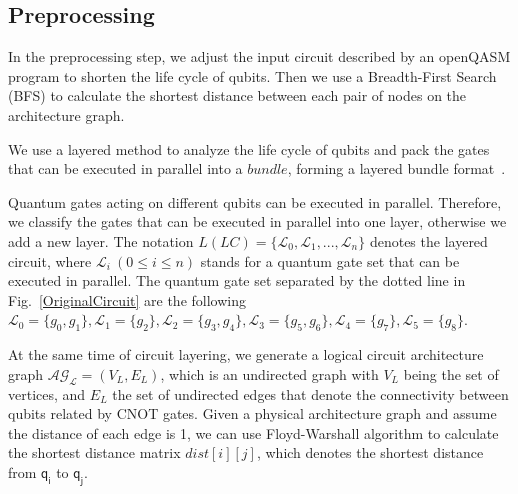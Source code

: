 \documentclass[journal]{IEEEtran}
\begin{document}
\subsection{Preprocessing}
In the preprocessing step, we adjust the input circuit described by an openQASM program to shorten the life cycle of qubits. Then we use a Breadth-First Search (BFS) to calculate the shortest distance between each pair of nodes on the architecture graph.

We use a layered method to analyze the life cycle of qubits and pack the gates that can be executed in parallel into a $bundle$, forming a layered bundle format~\cite{2019Zhang}.

Quantum gates acting on different qubits can be executed in parallel. Therefore, we classify the gates that can be executed in parallel into one layer, otherwise we add a new layer. The notation $L(LC)=\{\mathcal{L}_{0},\mathcal{L}_{1},...,\mathcal{L}_{n}\}$ denotes the layered circuit, where $\mathcal{L}_{i} \ (0 \le i \le n) $ stands for a quantum gate set that can be executed in parallel. The quantum gate set separated by the dotted line in Fig.~\ref{OriginalCircuit} are the following $\mathcal{L}_{0}=\{g_{0},g_{1}\},\mathcal{L}_{1}=\{g_{2}\},
\mathcal{L}_{2}=\{g_{3},g_{4}\},\mathcal{L}_{3}=\{g_{5},g_{6}\},\mathcal{L}_{4}=\{g_{7}\},\mathcal{L}_{5}=\{g_{8}\}$.

At the same time of circuit layering, we generate a logical circuit architecture graph $\mathcal{AG_{L}}=(V_{L},E_{L})$, which is an undirected graph with $V_{L}$ being the set of vertices, and $E_{L}$  the set of undirected edges that denote the connectivity between qubits related by CNOT gates.
Given a physical architecture graph and assume the distance of each edge is 1, we can use Floyd-Warshall algorithm to calculate the shortest distance matrix $dist[i][j]$, which denotes the shortest distance from $\textsf{q}_{\textsf{i}}$ to $\textsf{q}_{\textsf{j}}$. 
\end{document}

